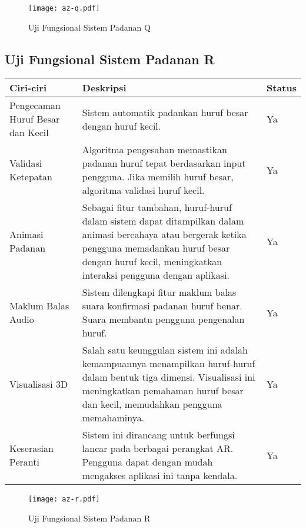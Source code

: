 \begin{itemize}
\begin{itemize}
\begin{itemize}
\begin{itemize}
\begin{itemize}
\begin{itemize}
\begin{itemize}
\begin{itemize}
\begin{flushleft}
\begin{figure}
    \centering
    \texttt{[image: az-q.pdf]}
    \caption{Uji Fungsional  Sistem Padanan Q }
    \label{fig:az-q.pdf}
\end{figure}


\subsection{Uji Fungsional  Sistem Padanan R}

\begin{tabular}{>{\raggedright}p{3cm}p{9cm}>{\centering\arraybackslash}p{2cm}}
\toprule
\textbf{Ciri-ciri} & \textbf{Deskripsi} & \textbf{Status} \\
\midrule
Pengecaman Huruf Besar dan Kecil & Sistem automatik padankan huruf besar dengan huruf kecil. & Ya \\

Validasi Ketepatan & Algoritma pengesahan memastikan padanan huruf tepat berdasarkan input pengguna. Jika memilih huruf besar, algoritma validasi huruf kecil. & Ya \\

Animasi Padanan & Sebagai fitur tambahan, huruf-huruf dalam sistem dapat ditampilkan dalam animasi bercahaya atau bergerak ketika pengguna memadankan huruf besar dengan huruf kecil, meningkatkan interaksi pengguna dengan aplikasi. & Ya \\

Maklum Balas Audio & Sistem dilengkapi fitur maklum balas suara konfirmasi padanan huruf benar. Suara membantu pengguna pengenalan huruf. & Ya \\

Visualisasi 3D & Salah satu keunggulan sistem ini adalah kemampuannya menampilkan huruf-huruf dalam bentuk tiga dimensi. Visualisasi ini meningkatkan pemahaman huruf besar dan kecil, memudahkan pengguna memahaminya. & Ya \\

Keserasian Peranti & Sistem ini dirancang untuk berfungsi lancar pada berbagai perangkat AR. Pengguna dapat dengan mudah mengakses aplikasi ini tanpa kendala. & Ya \\
\bottomrule
\end{tabular}

\begin{figure}
    \centering
    \texttt{[image: az-r.pdf]}
    \caption{Uji Fungsional  Sistem Padanan R }
    \label{fig:az-r.pdf}
\end{figure}



\end{flushleft}
\end{itemize}
\end{itemize}
\end{itemize}
\end{itemize}
\end{itemize}
\end{itemize}
\end{itemize}
\end{itemize}
